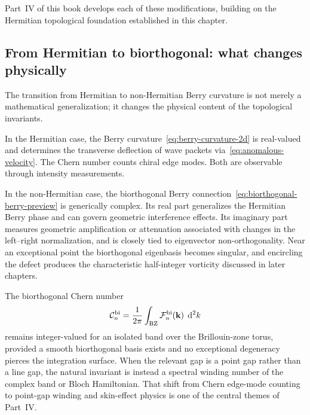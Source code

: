 Part~IV of this book develops each of these modifications, building on
the Hermitian topological foundation established in this chapter.

\subsection{From Hermitian to biorthogonal: what changes physically}
\label{ssec:biorthogonal-physical}

The transition from Hermitian to non-Hermitian Berry curvature is not
merely a mathematical generalization; it changes the physical content
of the topological invariants.

In the Hermitian case, the Berry curvature~\eqref{eq:berry-curvature-2d}
is real-valued and determines the transverse deflection of wave packets
via~\eqref{eq:anomalous-velocity}. The Chern number counts chiral edge
modes. Both are observable through intensity measurements.

In the non-Hermitian case, the biorthogonal Berry
connection~\eqref{eq:biorthogonal-berry-preview} is generically
complex. Its real part generalizes the Hermitian Berry phase and can
govern geometric interference effects. Its imaginary part measures
geometric amplification or attenuation associated with changes in the
left--right normalization, and is closely tied to eigenvector
non-orthogonality. Near an exceptional point the biorthogonal eigenbasis
becomes singular, and encircling the defect produces the characteristic
half-integer vorticity discussed in later chapters.

The biorthogonal Chern number
\begin{equation}
 \mathcal{C}_n^{\mathrm{bi}} = \frac{1}{2\pi}\int_{\mathrm{BZ}}
 \mathcal{F}_n^{\mathrm{bi}}(\mathbf{k})\;\mathop{}\!\mathrm{d}^2 k
 \label{eq:biorthogonal-chern}
\end{equation}
remains integer-valued for an isolated band over the Brillouin-zone
torus, provided a smooth biorthogonal basis exists and no exceptional
degeneracy pierces the integration surface. When the relevant gap is a
point gap rather than a line gap, the natural invariant is instead a
spectral winding number of the complex band or Bloch Hamiltonian. That
shift from Chern edge-mode counting to point-gap winding and skin-effect
physics is one of the central themes of Part~IV.
